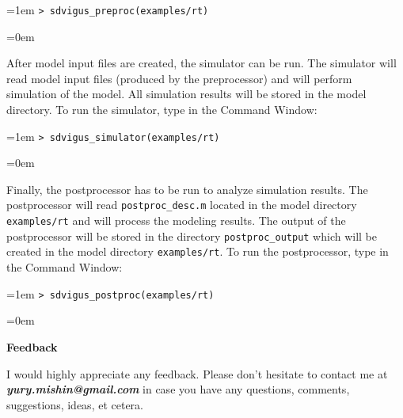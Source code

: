 \documentclass[a4paper,onesided,12pt]{letter}
\begin{document}
\begin{list}{}{\leftmargin=1em}
\leftskip=1em \texttt{\textgreater\ sdvigus\_preproc(\textquotesingle examples/rt\textquotesingle)}

\leftskip=0em

After model input files are created, the simulator can be run. The simulator will read model input files (produced by the preprocessor) and will perform simulation of the model. All simulation results will be stored in the model directory. To run the simulator, type in the Command Window:

\leftskip=1em \texttt{\textgreater\ sdvigus\_simulator(\textquotesingle examples/rt\textquotesingle)}

\leftskip=0em

Finally, the postprocessor has to be run to analyze simulation results. The postprocessor will read \texttt{postproc\_desc.m} located in the model directory \texttt{examples/rt} and will process the modeling results. The output of the postprocessor will be stored in the directory \texttt{postproc\_output} which will be created in the model directory \texttt{examples/rt}. To run the postprocessor, type in the Command Window:

\leftskip=1em \texttt{\textgreater\ sdvigus\_postproc(\textquotesingle examples/rt\textquotesingle)}

\leftskip=0em

\item \textbf{Feedback}

I would highly appreciate any feedback. Please don't hesitate to contact me at \textsl{\textbf{yury.mishin@gmail.com}} in case you have any questions, comments, suggestions, ideas, et cetera.

\end{list}
\end{document}
